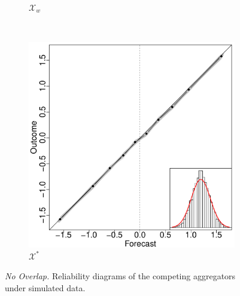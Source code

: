\documentclass[11pt]{article}
\theoremstyle{definition}
\theoremstyle{definition}
\begin{document}
\begin{figure}[t!]
\begin{subfigure}[b]{0.323\textwidth}
                \caption{$\mathcal{X}_w$}
        \label{RelOWANo}
        \end{subfigure}
        ~ %
        \begin{subfigure}[b]{0.323\textwidth}
                \includegraphics[width=\textwidth]{SimIndepELOP}
                \caption{$\mathcal{X}^*$ }
        \label{RelEOWANo}
        \end{subfigure}
   \caption{\textit{No Overlap.} Reliability diagrams of the competing aggregators  under simulated data. }
        \label{NOVerlap}
\end{figure}
\end{document}
